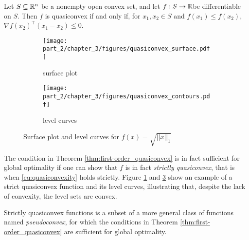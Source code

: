\begin{theorem}\label{thm:first-order_quasiconvex}
Let $S \subseteq \mathbb{R}^n$ be a nonempty open convex set, and let $f:S \to \mathbb{R}$\lb be differentiable on $S$. Then $f$ is quasiconvex if and only if, for $x_1, x_2 \in S$ and $f(x_1) \leq f(x_2)$, $\nabla f(x_2)^\top(x_1 - x_2) \leq 0$.
\end{theorem}
%
\begin{figure}[h]
	\begin{subfigure}[b]{0.45\textwidth}
		\texttt{[image: part\_2/chapter\_3/figures/quasiconvex\_surface.pdf]}\caption{surface plot}\label{fig:quasiconvex_surface}
	\end{subfigure}
	\begin{subfigure}[b]{0.45\textwidth}
		\texttt{[image: part\_2/chapter\_3/figures/quasiconvex\_contours.pdf]}
	\caption{level curves}\label{fig:quasiconvex_contours}
	\end{subfigure}
	\caption{Surface plot and level curves for $f(x) = \sqrt{||x||_1}$} 
\end{figure}

The condition in Theorem \ref{thm:first-order_quasiconvex} is in fact sufficient for global optimality if one can show that $f$ is in fact \emph{strictly quasiconvex}, that is when \eqref{eq:quasiconvexity} holds strictly. Figure \ref{fig:quasiconvex_surface} and \ref{fig:quasiconvex_contours} show an example of a strict quasiconvex function and its level curves, illustrating that, despite the lack of convexity, the level sets are convex.

Strictly quasiconvex functions is a subset of a more general class of functions named \emph{pseudoconvex}, for which the conditions in Theorem \ref{thm:first-order_quasiconvex} are sufficient for global optimality. 